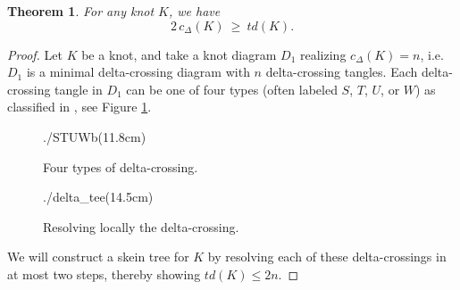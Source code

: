 \documentclass[pdftex, a4paper, 12pt, oneside]{amsart}
\numberwithin{equation}{section}
\theoremstyle{plain}
\newtheorem{theorem}{Theorem}[section]
\theoremstyle{definition}
\begin{document}
	\begin{theorem}\label{thm:delta-inequality}
		For any knot $K$, we have 
		\[ 2\,c_{\Delta}(K)\ \ge\ td(K).\]
	\end{theorem}
	
	\begin{proof}
		Let $K$ be a knot, and take a knot diagram $D_1$ realizing $c_{\Delta}(K)=n$, i.e. $D_1$ is a minimal delta-crossing diagram with $n$ delta-crossing tangles. Each delta-crossing tangle in $D_1$ can be one of four types (often labeled $S$, $T$, $U$, or $W$) as classified in \cite{NSS15}, see Figure \ref{STUWb}.
		
		
			\begin{figure}[h!t]
			\centering		
			\begin{lpic}[]{./STUWb(11.8cm)}
				
			\end{lpic}
			\caption{Four types of delta-crossing.}
			\label{STUWb}
		\end{figure}
		
		
		
		
		
		\begin{figure}[h!t]
			\centering		
			\begin{lpic}[]{./delta_tee(14.5cm)}
				
			\end{lpic}
			\caption{Resolving locally the delta-crossing.}
			\label{delta_tee}
		\end{figure}
		
		
		We will construct a skein tree for $K$ by resolving each of these delta-crossings in at most two steps, thereby showing $td(K)\le 2n$.
		

\end{proof}
\end{document}
